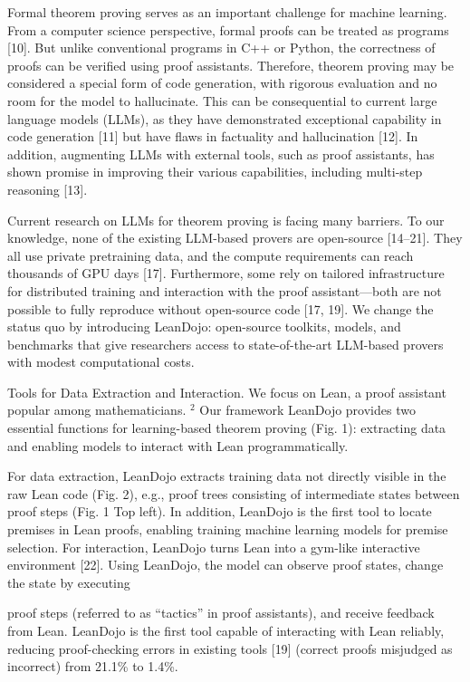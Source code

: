 \documentclass[
]{article}
\begin{document}
Formal theorem proving serves as an important challenge for machine
learning. From a computer science perspective, formal proofs can be
treated as programs {[}10{]}. But unlike conventional programs in C++ or
Python, the correctness of proofs can be verified using proof
assistants. Therefore, theorem proving may be considered a special form
of code generation, with rigorous evaluation and no room for the model
to hallucinate. This can be consequential to current large language
models (LLMs), as they have demonstrated exceptional capability in code
generation {[}11{]} but have flaws in factuality and hallucination
{[}12{]}. In addition, augmenting LLMs with external tools, such as
proof assistants, has shown promise in improving their various
capabilities, including multi-step reasoning {[}13{]}.

Current research on LLMs for theorem proving is facing many barriers. To
our knowledge, none of the existing LLM-based provers are open-source
{[}14--21{]}. They all use private pretraining data, and the compute
requirements can reach thousands of GPU days {[}17{]}. Furthermore, some
rely on tailored infrastructure for distributed training and interaction
with the proof assistant---both are not possible to fully reproduce
without open-source code {[}17, 19{]}. We change the status quo by
introducing LeanDojo: open-source toolkits, models, and benchmarks that
give researchers access to state-of-the-art LLM-based provers with
modest computational costs.

Tools for Data Extraction and Interaction. We focus on Lean, a proof
assistant popular among mathematicians. \(^{2}\) Our framework LeanDojo
provides two essential functions for learning-based theorem proving
(Fig. 1): extracting data and enabling models to interact with Lean
programmatically.

For data extraction, LeanDojo extracts training data not directly
visible in the raw Lean code (Fig. 2), e.g., proof trees consisting of
intermediate states between proof steps (Fig. 1 Top left). In addition,
LeanDojo is the first tool to locate premises in Lean proofs, enabling
training machine learning models for premise selection. For interaction,
LeanDojo turns Lean into a gym-like interactive environment {[}22{]}.
Using LeanDojo, the model can observe proof states, change the state by
executing

proof steps (referred to as ``tactics'' in proof assistants), and
receive feedback from Lean. LeanDojo is the first tool capable of
interacting with Lean reliably, reducing proof-checking errors in
existing tools {[}19{]} (correct proofs misjudged as incorrect) from
21.1\% to 1.4\%.
\end{document}
